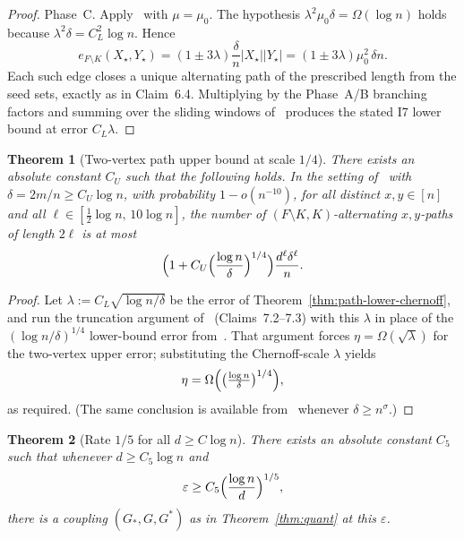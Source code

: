 \documentclass[11pt]{article}
\newtheorem{theorem}{Theorem}
\begin{document}
\begin{proof}
Phase~C.
Apply~\cite[Lemma~6.15]{BIM25} with \(\mu=\mu_0\). The hypothesis
\(\lambda^2\mu_0\delta=\Omega(\log n)\) holds because \(\lambda^2\delta=C_L^2\log n\).
Hence
\[
e_{F\setminus K}(X_\star,Y_\star)=(1\pm 3\lambda)\frac{\delta}{n}|X_\star||Y_\star|
=(1\pm 3\lambda)\mu_0^2\,\delta n.
\]
Each such edge closes a unique alternating path of the prescribed length from the
seed sets, exactly as in Claim~6.4. Multiplying by the Phase~A/B branching
factors and summing over the sliding windows of~\cite[§6.5]{BIM25} produces the
stated I7 lower bound at error \(C_L\lambda\).
\end{proof}

\begin{theorem}[Two-vertex path upper bound at scale \(1/4\)]
\label{thm:U}
There exists an absolute constant \(C_U\) such that the following holds.
In the setting of~\cite[Lemma~7.1]{BIM25} with \(\delta=2m/n\ge C_U\log n\), with
probability \(1-o(n^{-10})\), for all distinct \(x,y\in[n]\) and all
\(\ell\in[\tfrac12\log n,\,10\log n]\), the number of
\((F\setminus K,K)\)-alternating \(x,y\)-paths of length \(2\ell\) is at most
\[
\Bigl(1+C_U\Bigl(\frac{\log n}{\delta}\Bigr)^{1/4}\Bigr)\frac{d^\ell\delta^\ell}{n}.
\]
\end{theorem}

\begin{proof}
Let \(\lambda:=C_L\sqrt{\log n/\delta}\) be the error of
Theorem~\ref{thm:path-lower-chernoff}, and run the truncation argument
of~\cite[Lemma~7.1]{BIM25} (Claims~7.2--7.3) with this \(\lambda\) in place of the
\((\log n/\delta)^{1/4}\) lower-bound error from~\cite[Theorem~6.1]{BIM25}.
That argument forces \(\eta=\Omega(\sqrt{\lambda})\) for the two-vertex upper
error; substituting the Chernoff-scale \(\lambda\) yields
\[
\eta=\Omega\Bigl(\bigl(\tfrac{\log n}{\delta}\bigr)^{1/4}\Bigr),
\]
as required. (The same conclusion is available from~\cite[Lemma~8.1]{BIM25}
whenever \(\delta\ge n^{\sigma}\).)
\end{proof}

\begin{theorem}[Rate \(1/5\) for all \(d\ge C\log n\)]
\label{thm:quant-fifth}
There exists an absolute constant \(C_5\) such that whenever \(d\ge C_5\log n\) and
\[
\varepsilon\ge C_5\Bigl(\frac{\log n}{d}\Bigr)^{1/5},
\]
there is a coupling \((G_*,G,G^*)\) as in Theorem~\ref{thm:quant} at this
\(\varepsilon\).
\end{theorem}
\end{document}

